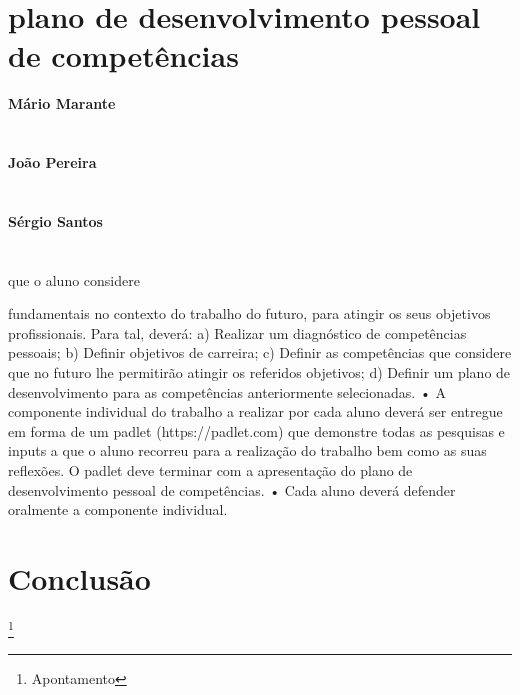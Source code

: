 \section{plano de desenvolvimento pessoal de competências}
\textbf{Mário Marante}\\
\\ \\
\textbf{João Pereira}\\
\\ \\
\textbf{Sérgio Santos}\\
\\ \\



que o aluno considere

fundamentais no contexto do trabalho do futuro, para atingir os seus objetivos
profissionais. Para tal, deverá:
a) Realizar um diagnóstico de competências pessoais;
b) Definir objetivos de carreira;
c) Definir as competências que considere que no futuro lhe permitirão atingir os
referidos objetivos;
d) Definir um plano de desenvolvimento para as competências anteriormente
selecionadas.
• A componente individual do trabalho a realizar por cada aluno deverá ser entregue em forma de um padlet (https://padlet.com) que demonstre todas as pesquisas e inputs a que o aluno recorreu para a realização do trabalho bem como as suas reflexões. O padlet deve terminar com a apresentação do plano de
desenvolvimento pessoal de competências.
• Cada aluno deverá defender oralmente a componente individual.


\newpage
\section{Conclusão}



\newpage
%
%
\listoffigures
\cite{*}

\newpage
\footnote{Apontamento}


